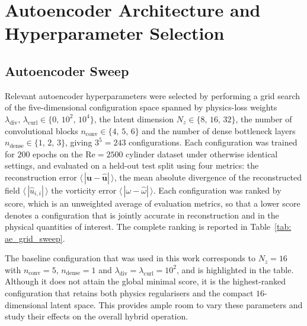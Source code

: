 \chapter{Autoencoder Architecture and Hyperparameter Selection}



\section{Autoencoder Sweep}

Relevant autoencoder hyperparameters were selected by performing a grid search of the five-dimensional configuration space spanned by physics-loss weights $\lambda_\text{div},\,\lambda_\text{curl} \in \{0,\,10^2,\,10^4\}$, the latent
dimension $N_z \in \{8,\,16,\,32\}$, the number of convolutional blocks $n_\text{conv} \in \{4,\,5,\,6\}$ and the number of dense bottleneck layers $n_\text{dense} \in \{1,\,2,\,3\}$, giving $3^5 = 243$ configurations. Each configuration was trained for $200$ epochs on the $\mathrm{Re}=2500$ cylinder dataset under otherwise identical settings, and evaluated on a held-out test split using four metrics: the reconstruction error $\langle\,|\mathbf{u}-\hat{\mathbf{u}}|\,\rangle$, the mean absolute divergence of the reconstructed field $\langle\,|\hat{u}_{i,i}|\,\rangle$  the vorticity error $\langle\,|\omega-\hat{\omega}|\,\rangle$. Each configuration was ranked by score, which is an unweighted average of evaluation metrics, so that a lower score denotes a configuration that is jointly accurate in reconstruction and in the
physical quantities of interest. The complete ranking is reported in Table~\ref{tab: ae_grid_sweep}. 

The baseline configuration that was used in this work corresponds to $N_z=16$ with $n_\text{conv}=5$, $n_\text{dense}=1$ and $\lambda_\text{div}=\lambda_\text{curl}=10^2$, and is highlighted in the table. Although it does not attain the global minimal score, it is the highest-ranked configuration that retains both physics regularisers and the compact $16$-dimensional latent space. This provides ample room to vary these parameters and study their effects on the overall hybrid operation. 
 

